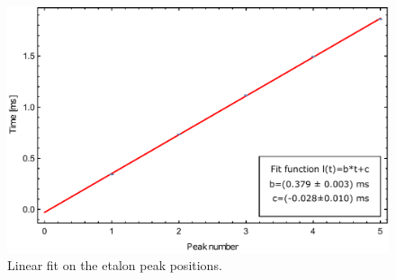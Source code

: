 \begin{figure}[htb]
\centering
\includegraphics[width=1.0\linewidth]{graphics/ethalon_linearfit}
\caption[Lienear fit on etalon peak positions]{Linear fit on the etalon peak positions.}
\label{fig:ethalon_linearfit}
\end{figure}

